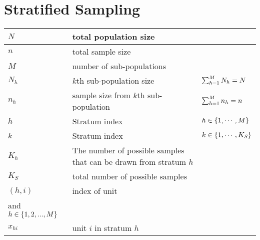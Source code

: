 \section{Stratified Sampling \cite{statistics/book/Statistics-for-Data-Scientists/Maurits-Kaptein}}\label{Sampling Plans/Representative Sampling/Stratified Sampling}

\begin{customArrayStretch}{1.3}
\begin{table}[H]
    \centering
    \begin{tabular}{l p{6cm} p{3.5cm}}
        \hline
        
        $N$ & total population size & \\ \hline
        
        $n$ & total sample size & \\ \hline
        
        $M$ & number of sub-populations & \\ \hline
        
        $N_h$ & $k$th sub-population size & $\textstyle\sum_{h=1}^{M} N_h = N$ \\ \hline
        
        $n_h$ & sample size from $k$th sub-population & $\textstyle\sum_{h=1}^{M} n_h = n$ \\ \hline

        $h$ & Stratum index & $h \in \left\{1, \cdots, M\right\}$ \\ \hline

        $k$ & Stratum index & $k \in \left\{1, \cdots, K_S\right\}$ \\ \hline
        
        $K_h$ & The number of possible samples that can be drawn from stratum $h$ \\ \hline
        
        $K_S$ & total number of possible samples \\ \hline
        
        $(h, i)$ & index of unit & \begin{minipage}{3.2cm}
            \vspace{0.1cm}
            $i \in \dCurlyBrac{1, 2,\cdots, N_h }$ \\
            and $h \in \left\{1, 2,..., M\right\}$
            \vspace{0.1cm}
        \end{minipage}  \\ \hline
        
        $x_{hi}$ & unit $i$ in stratum $h$ \\ \hline


\end{tabular}
\end{table}
\end{customArrayStretch}
